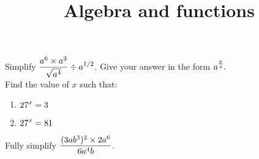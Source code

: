\documentclass[20pts]{exam}
\title{Algebra and functions} %
\begin{document}
\maketitle

\begin{questions}
    \question[2]
    Simplify $\mathlarger{\frac{a^6\times a^3}{\sqrt{a^4}} \div a^{1/2}}$. Give your answer in the form $\mathlarger{a^{\frac{p}{q}}.}$\\
    \question[2]
    Find the value of $x$ such that:\\
    \begin{enumerate}
        \item $\mathlarger{27^x = 3}$
        \item $\mathlarger{27^x = 81}$
    \end{enumerate}
    \question[3]
    Fully simplify $\mathlarger{\frac{(3ab^3)^2\times 2a^6}{6a^4b}}$.
\end{questions}
\end{document}
